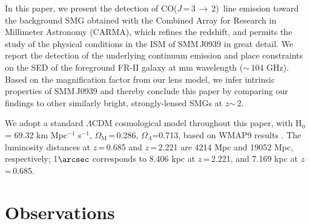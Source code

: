 \documentclass[twocolumn,apj,numberedappendix]{emulateapj}
\newcommand{\CO}{\mbox{CO($J$\,=\,3\,$\rightarrow$\,2) }}
\newcommand{\pmOne}{\mbox{$^{-1}$}}
\begin{document}
In this paper, we present the detection of \CO line emission toward the background SMG obtained with the Combined
Array for Research in Millimeter Astronomy (CARMA), which refines the redshift, and permits the study of the physical conditions in the ISM of SMM\,J0939 in great detail. We report the detection of the underlying continuum emission and place constraints on the SED of the foreground FR-II galaxy at mm wavelength ($\sim$\,104 GHz). Based on the magnification factor from our lens model, we infer intrinsic properties of SMM\,J0939 and thereby 
conclude this paper by comparing our findings to other similarly bright, strongly-lensed SMGs at $z$$\sim$\,2.

We adopt a standard $\Lambda$CDM cosmological model throughout this paper, with H$_0$= 69.32 km\,\,Mpc\pmOne\,\,s\pmOne, $\Omega_\textrm{M}$\,=\,0.286, $\Omega_\Lambda$=0.713, based on WMAP9 results \citep{Hinshaw13a}.
The luminosity distances at $z$\,=\,0.685 and $z$\,=\,2.221 are 4214 Mpc and 19052 Mpc, respectively; 1$\arcsec$
corresponds to 8.406 kpc at $z$\,=\,2.221, and 7.169 kpc at $z$\,=\,0.685.

\section{Observations}\label{sec:obs}
\end{document}
